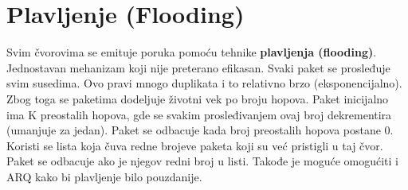 \documentclass[a4paper]{article}
\begin{document}
\section{Plavljenje (Flooding)}
    Svim čvorovima se emituje poruka pomoću tehnike \textbf{plavljenja (flooding)}. Jednostavan mehanizam 
    koji nije preterano efikasan. Svaki paket se prosleđuje svim susedima. Ovo pravi
    mnogo duplikata i to relativno brzo (eksponencijalno). Zbog toga se paketima dodeljuje životni vek po broju
    hopova. Paket inicijalno ima K preostalih hopova, gde se svakim prosleđivanjem ovaj broj
    dekrementira (umanjuje za jedan). Paket se odbacuje kada broj preostalih hopova postane 0. \\
    \indent Koristi se lista koja čuva redne brojeve paketa koji su već                     pristigli u taj
    čvor. Paket se odbacuje ako je njegov redni broj u listi. Takođe je moguće omogućiti 
    i ARQ kako bi plavljenje bilo pouzdanije. 
\end{document}
